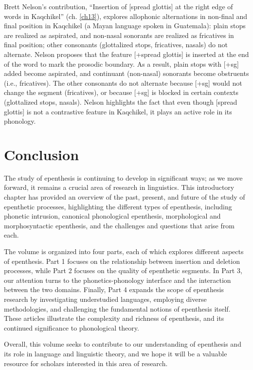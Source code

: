 \documentclass[output=paper,colorlinks,citecolor=brown]{langscibook}
\begin{document}
Brett Nelson’s contribution, “Insertion of [spread glottis] at the right edge of words in Kaqchikel” (ch. \ref{ch13}), explores allophonic alternations in non-final and final position in Kaqchikel (a Mayan language spoken in Guatemala): plain stops are realized as aspirated, and non-nasal sonorants are realized as fricatives in final position; other consonants (glottalized stops, fricatives, nasals) do not alternate. Nelson proposes that the feature [+spread glottis] is inserted at the end of the word to mark the prosodic boundary. As a result, plain stops with [+sg] added become aspirated, and continuant (non-nasal) sonorants become obstruents (i.e., fricatives). The other consonants do not alternate because [+sg] would not change the segment (fricatives), or because [+sg] is blocked in certain contexts (glottalized stops, nasals). Nelson highlights the fact that even though [spread glottis] is not a contrastive feature in Kaqchikel, it plays an active role in its phonology.

\section{Conclusion}
The study of epenthesis is continuing to develop in significant ways; as we move forward, it remains a crucial area of research in linguistics. This introductory chapter has provided an overview of the past, present, and future of the study of epenthetic processes, highlighting the different types of epenthesis, including phonetic intrusion, canonical phonological epenthesis, morphological and morphosyntactic epenthesis, and the challenges and questions that arise from each.

The volume is organized into four parts, each of which explores different aspects of epenthesis. Part 1 focuses on the relationship between insertion and deletion processes, while Part 2 focuses on the quality of epenthetic segments. In Part 3, our attention turns to the phonetics-phonology interface and the interaction between the two domains. Finally, Part 4 expands the scope of epenthesis research by investigating understudied languages, employing diverse methodologies, and challenging the fundamental notions of epenthesis itself. These articles illustrate the complexity and richness of epenthesis, and its continued significance to phonological theory.

Overall, this volume seeks to contribute to our understanding of epenthesis and its role in language and linguistic theory, and we hope it will be a valuable resource for scholars interested in this area of research.
\end{document}
